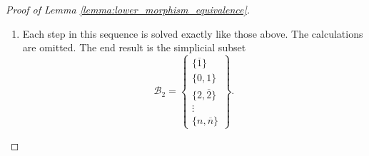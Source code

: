 \documentclass[main.tex]{subfiles}
\begin{document}
\begin{proof}[Proof of Lemma \ref{lemma:lower_morphism_equivalence}]
\begin{enumerate}
\begin{itemize}
\begin{itemize}
            \item For $n \geq 4$, all scaled and marked simplices belong to $\S^{\mathcal{A}'}$ by \hyperref[lemma:subset_of_simplex_contains_k_simplices]{Lemma~\ref*{lemma:subset_of_simplex_contains_k_simplices}}.
          \end{itemize}
          The basal sets are of the form
          \begin{equation*}
            \{k, a_{1}, \ldots, a_{n-k}, \overline{k-1}, \ldots, \overline{1}\},
          \end{equation*}
          where each $a_{1}$, \dots, $a_{n-k}$ is of the form $\ell$ or $\overline{\ell}$ for $k+1 \leq \ell \leq n$. In each case, the simplex $\{a_{n-k}, \overline{k}, \overline{k-1}\}$ is scaled. Thus, the conditions of the \hyperref[lemma:pivot_trick]{Pivot Trick}, the top morphism is marked-scaled anodyne.
      \end{itemize}

      We have now added the simplices promised in part 1., and are left with the simplicial subset $\S^{\mathcal{A}_{2}}_{[2n+1]}$, where
      \begin{equation*}
        \mathcal{A}_{2}
        = \left\{ \substack{ \{\overline{n}, \ldots, \overline{1}\} \\ \{0, 1\} \\ \{1, \overline{1}\} \\ \vdots \\ \{n, \overline{n}\} } \right\}.
      \end{equation*}

    \item Each step in this sequence is solved exactly like those above. The calculations are omitted. The end result is the simplicial subset
      \begin{equation*}
        \mathcal{B}_{2} = 
        \left\{ \substack{ \{\overline{1}\} \\ \{0, 1\} \\ \{2, \overline{2}\} \\ \vdots \\ \{n, \overline{n}\} } \right\}.
      \end{equation*}



\end{enumerate}
\end{proof}
\end{document}
